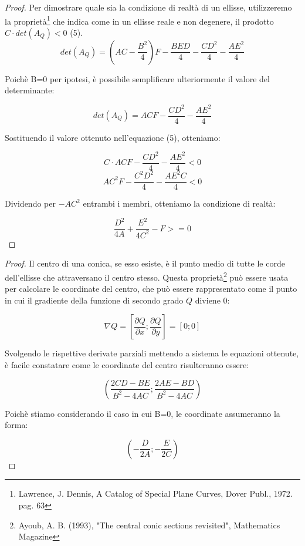 \documentclass[10pt, a4paper]{article}
\theoremstyle{remark}
\begin{document}
	\begin{proof}
		Per dimostrare quale sia la condizione di realtà di un ellisse, utilizzeremo la proprietà\footnote{Lawrence, J. Dennis, A Catalog of Special Plane Curves, Dover Publ., 1972. pag. 63} che indica come in un ellisse reale e non degenere, il prodotto $C \cdot det(A_Q) < 0$  (5).\\
		
		$$
			det(A_Q) = \left( AC - \frac{B^2}{4} \right) F - \frac{BED}{4} - \frac{CD^2}{4} - \frac{AE^2}{4}
		$$
		
		Poichè B=0 per ipotesi, è possibile semplificare ulteriormente il valore del determinante:
		
		$$
			det(A_Q) = ACF - \frac{CD^2}{4} - \frac{AE^2}{4}
		$$
		
		Sostituendo il valore ottenuto nell'equazione (5), otteniamo:
		
		$$
		 C \cdot ACF - \frac{CD^2}{4} - \frac{AE^2}{4} < 0
		$$
		$$
		AC^2F - \frac{C^2D^2}{4} - \frac{AE^2C}{4} < 0
		$$
		
		Dividendo per $-AC^2$ entrambi i membri, otteniamo la condizione di realtà:
		
		$$
		\frac{D^2}{4A} + \frac{E^2}{4C^2} - F >= 0
		$$
		
	\end{proof}

	\begin{proof}
		Il centro di una conica, se esso esiste, è il punto medio di tutte le corde dell'ellisse che attraversano il centro stesso. Questa proprietà\footnote{Ayoub, A. B. (1993), "The central conic sections revisited", Mathematics Magazine} può essere usata per calcolare le coordinate del centro, che può essere rappresentato come il punto in cui il gradiente della funzione di secondo grado $Q$ diviene 0: 
		
		$$\nabla Q = \left[ \frac{\partial Q}{\partial x} ; \frac{\partial Q}{\partial y} \right] = [0;0] $$
		
		Svolgendo le rispettive derivate parziali mettendo a sistema le equazioni ottenute, è facile constatare come le coordinate del centro risulteranno essere:
		
		$$ \left( \frac{2CD-BE}{B^2-4AC}; \frac{2AE-BD}{B^2-4AC} \right) $$
		
		Poichè stiamo considerando il caso in cui B=0, le coordinate assumeranno la forma:
		
		$$ \left( -\frac{D}{2A}; -\frac{E}{2C} \right) $$
		
	\end{proof}
	
\end{document}
